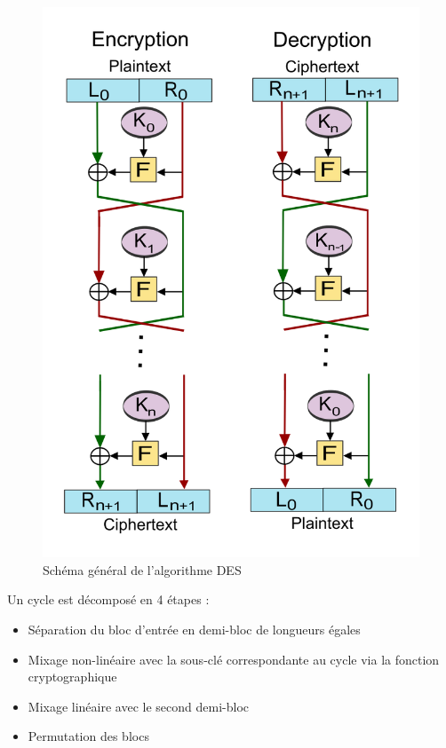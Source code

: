 \documentclass[a4paper]{article}
\begin{document}
\smallbreak
\begin{figure}
\begin{center}
\includegraphics[scale=0.2]{images/feistel_network.png} 
\caption{Schéma général de l'algorithme DES}
\end{center}
\end{figure}

\smallbreak
Un cycle est décomposé en 4 étapes :
\begin{itemize}
\item Séparation du bloc d'entrée en demi-bloc de longueurs égales
\item Mixage non-linéaire avec la sous-clé correspondante au cycle via la fonction cryptographique
\item Mixage linéaire avec le second demi-bloc
\item Permutation des blocs
\end{itemize}
\smallbreak
\newpage
\end{document}
